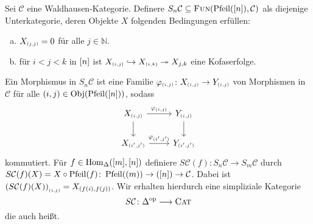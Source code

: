 \begin{definition}
	Sei $\mathcal{C}$ eine Waldhausen-Kategorie.
	Definere $S_n \mathcal{C} \subseteq \FUN \enbrace*{\operatorname{Pfeil}([n]),\mathcal{C}}$ als diejenige Unterkategorie, deren Objekte $X$ folgenden Bedingungen erfüllen: 
	\begin{enumerate}[(a)]
		\item $X_\ssbrace{j,j} = 0$ für alle $j \in \mathbb{N}$.
		\item für $i < j< k$ in $\benbrace*{n}$ ist $X_\ssbrace{i,j} \hookrightarrow X_\ssbrace{i,k} \twoheadrightarrow X_{j,k}$ eine Kofaserfolge.
	\end{enumerate}
	Ein Morphismus in $S_n \mathcal{C}$ ist eine Familie $\varphi_\ssbrace{i,j} \colon X_\ssbrace{i,j} \to Y_\ssbrace{i,j}$ von Morphismen in $\mathcal{C}$ für alle $(i,j) \in \Obj(\operatorname{Pfeil}(\benbrace*{n}))$, sodass
	\[
		\begin{tikzcd}
			X_\ssbrace{i,j} \dar \rar["\varphi_\ssbrace{i,j}"] & Y_\ssbrace{i,j} \dar \\
			X_\ssbrace{i',j'} \rar["\varphi_\ssbrace{i',j'}"] & Y_\ssbrace{i',j'}
		\end{tikzcd}
	\]
	kommutiert.
	Für $f \in \Hom_\Delta \enbrace*{\benbrace*{m},\benbrace*{n}}$ definiere $S \mathcal{C}(f) \colon S_n \mathcal{C} \to S_m \mathcal{C}$ durch $S \mathcal{C}(f)(X)= X \circ \operatorname{Pfeil}(f) \colon \operatorname{Pfeil}(\enbrace*{m}) \to \operatorname([n]) \to \mathcal{C}$.
	Dabei ist $\enbrace*{S \mathcal{C}(f)(X)}_\ssbrace{i,j} = X_{\enbrace*{f(i),f(j)}}$.
	Wir erhalten hierdurch eine simpliziale Kategorie 
	\[
		S \mathcal{C} \colon \Delta^\op \longrightarrow \textsc{Cat}
	\]
	die auch  heißt.
\end{definition}

